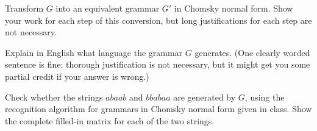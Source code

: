 \documentclass[solution, letterpaper]{cscie121}
\begin{document}
\subproblem
Transform $G$ into an equivalent grammar $G'$ in Chomsky normal form. Show your work for each step of this conversion, but long justifications for each step are not necessary.

\subproblem 
Explain in English what language the grammar $G$ generates. (One clearly worded sentence is fine; thorough justification is not necessary, but it might get you some partial credit if your answer is wrong.)

\subproblem
Check whether the strings $abaab$ and $bbabaa$ are generated by $G$, using the recognition algorithm for grammars in Chomsky normal form given in class. Show the complete filled-in matrix for each of the two strings.


\begin{solution}
\end{solution}
\end{document}
